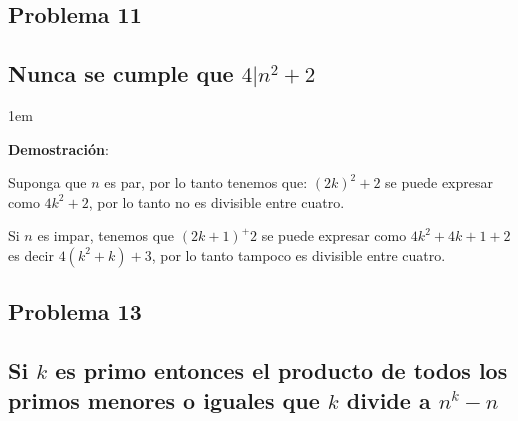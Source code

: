 \documentclass[12pt, fleqn]{article}                             %
\newenvironment{SmallIndentation}[1][0.75em]                    %
    {\begin{adjustwidth}{#1}{}\begin{footnotesize}}                 %
    {\end{footnotesize}\end{adjustwidth}}                           %
\begin{document}
    \subsection{Problema 11}
    \subsection*{Nunca se cumple que $4|n^2 +2$}

        \begin{SmallIndentation}[1em]
            \textbf{Demostración}:

            Suponga que $n$ es par, por lo tanto tenemos que:
            $(2k)^2+2$ se puede expresar como $4k^2 + 2$, por lo tanto no es divisible entre
            cuatro.

            Si $n$ es impar, tenemos que $(2k+1)^+2$ se puede expresar como $4k^2 + 4k + 1 + 2$
            es decir $4(k^2+k) +3$, por lo tanto tampoco es divisible entre cuatro.

        \end{SmallIndentation}


    \subsection{Problema 13}
    \subsection*{Si $k$ es primo entonces el producto de todos los primos menores o
        iguales que $k$ divide a $n^k - n$}
\end{document}
